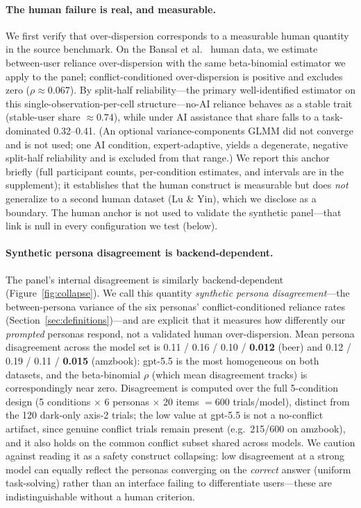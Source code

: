 \documentclass[manuscript,nonacm]{acmart}
\begin{document}
\paragraph{The human failure is real, and measurable.} We first verify that over-dispersion corresponds to
a measurable human quantity in the source benchmark. On the
Bansal et al.~\cite{bansal2021whole} human data, we estimate between-user reliance over-dispersion with the
same beta-binomial estimator we apply to the panel; conflict-conditioned over-dispersion is positive and
excludes zero ($\rho \approx 0.067$). By split-half reliability---the primary well-identified estimator on
this single-observation-per-cell structure---no-AI reliance behaves as a stable trait (stable-user share
$\approx 0.74$), while under AI assistance that share falls to a task-dominated 0.32--0.41. (An optional
variance-components GLMM did not converge and is not used; one AI condition, expert-adaptive, yields a
degenerate, negative split-half reliability and is excluded from that range.) We report this anchor briefly (full
participant counts, per-condition estimates, and intervals are in the supplement); it establishes that the
human construct is measurable but does \emph{not} generalize to a second human dataset (Lu \& Yin), which we
disclose as a boundary. The human anchor is not used to validate the synthetic panel---that link is null in
every configuration we test (below).

\paragraph{Synthetic persona disagreement is backend-dependent.} The panel's internal disagreement is
similarly backend-dependent (Figure~\ref{fig:collapse}). We call this quantity \emph{synthetic persona
disagreement}---the between-persona variance of the six personas' conflict-conditioned reliance rates
(Section~\ref{sec:definitions})---and are explicit that
it measures how differently our \emph{prompted} personas respond, not a validated human over-dispersion.
Mean persona disagreement across the model set is 0.11 / 0.16 / 0.10 / \textbf{0.012} (beer) and
0.12 / 0.19 / 0.11 / \textbf{0.015} (amzbook): gpt-5.5 is the most homogeneous on both datasets, and the
beta-binomial $\rho$ (which mean disagreement tracks) is correspondingly near zero. Disagreement is
computed over the full 5-condition design (5 conditions $\times$ 6 personas $\times$ 20 items $=600$
trials/model), distinct from the 120 dark-only axis-2 trials; the low value at gpt-5.5 is not a no-conflict
artifact, since genuine conflict trials remain present (e.g.\ 215/600 on amzbook), and it also holds on the
common conflict subset shared across models. We caution against reading it as a safety construct collapsing:
low disagreement at a strong model can equally reflect the personas converging on the \emph{correct} answer
(uniform task-solving) rather than an interface failing to differentiate users---these are indistinguishable
without a human criterion.
\end{document}
